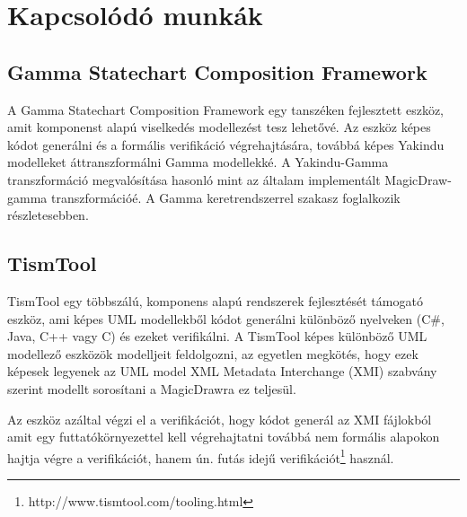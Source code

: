 \chapter{Kapcsolódó munkák}
\label{chap:related-work}
\section{Gamma Statechart Composition Framework}
A Gamma Statechart Composition Framework\cite{gammaf} egy tanszéken fejlesztett eszköz, amit komponenst alapú viselkedés modellezést tesz lehetővé. Az eszköz képes kódot generálni és a formális verifikáció végrehajtására, továbbá képes Yakindu modelleket áttranszformálni Gamma modellekké. A Yakindu-Gamma transzformáció megvalósítása hasonló mint az általam implementált MagicDraw-gamma transzformációé. A Gamma keretrendszerrel  szakasz foglalkozik részletesebben. 

\section{TismTool}

TismTool\cite{veugen2012framework} egy többszálú, komponens alapú rendszerek fejlesztését támogató eszköz, ami képes UML modellekből kódot generálni különböző nyelveken (C\#, Java, C++ vagy C) és ezeket verifikálni. A TismTool képes különböző UML modellező eszközök modelljeit feldolgozni, az egyetlen megkötés, hogy ezek képesek legyenek az UML model XML Metadata Interchange (XMI) szabvány szerint modellt sorosítani a MagicDrawra ez teljesül.

Az eszköz azáltal végzi el a verifikációt, hogy kódot generál az XMI fájlokból amit egy futtatókörnyezettel kell végrehajtatni továbbá nem formális alapokon hajtja végre a verifikációt, hanem ún. futás idejű verifikációt\footnote{http://www.tismtool.com/tooling.html} használ.





